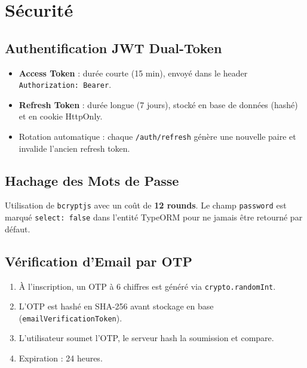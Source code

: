 \documentclass[12pt,a4paper]{report}
\begin{document}
\chapter{Sécurité}

\section{Authentification JWT Dual-Token}

\begin{infobox}
\begin{itemize}[nosep]
  \item \textbf{Access Token} : durée courte (15 min), envoyé dans le header \texttt{Authorization: Bearer}.
  \item \textbf{Refresh Token} : durée longue (7 jours), stocké en base de données (hashé) et en cookie HttpOnly.
  \item Rotation automatique : chaque \texttt{/auth/refresh} génère une nouvelle paire et invalide l'ancien refresh token.
\end{itemize}
\end{infobox}

\section{Hachage des Mots de Passe}
Utilisation de \texttt{bcryptjs} avec un coût de \textbf{12 rounds}. Le champ \texttt{password} est marqué \texttt{select: false} dans l'entité TypeORM pour ne jamais être retourné par défaut.

\section{Vérification d'Email par OTP}
\begin{enumerate}
  \item À l'inscription, un OTP à 6 chiffres est généré via \texttt{crypto.randomInt}.
  \item L'OTP est hashé en SHA-256 avant stockage en base (\texttt{emailVerificationToken}).
  \item L'utilisateur soumet l'OTP, le serveur hash la soumission et compare.
  \item Expiration : 24 heures.
\end{enumerate}
\end{document}

